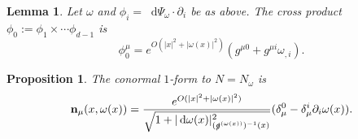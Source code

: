 \documentclass[reqno,12pt,letterpaper]{amsart}
\newcommand*\dif{\mathop{}\!\mathrm{d}}
\newcommand{\normal}{\mathbf n}
\newtheorem{lemma}[theorem]{Lemma}
\newtheorem{proposition}[theorem]{Proposition}
\theoremstyle{definition}
\numberwithin{equation}{section}
\begin{document}
\begin{lemma}
Let $\omega$ and $\phi_i = \dif \Psi_\omega \cdot \partial_i$ be as above.
The cross product $\phi_0 := \phi_1 \times \cdots \phi_{d - 1}$ is 
\begin{equation}\label{phi0 components}
\phi_0^\mu = e^{O(|x|^2 + |\omega(x)|^2)} (g^{\mu 0} + g^{\mu i}\omega_{,i}).
\end{equation}
\end{lemma}


\begin{proposition}
The conormal $1$-form to $N = N_\omega$ is
\begin{equation}\label{conormal}
\normal_\mu(x, \omega(x)) = \frac{e^{O(|x|^2 + |\omega(x)|^2)}}{\sqrt{1 + |\dif \omega(x)|^2_{(\slashed g^{(\omega(x))})^{-1}(x)}}} (\delta^0_\mu - \delta^i_\mu \partial_i \omega(x)).
\end{equation}
\end{proposition}
\end{document}
